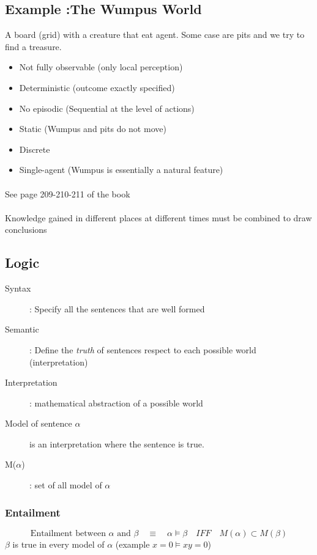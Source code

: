 \subsection{Example :The Wumpus World}
A board (grid) with a creature that eat agent. Some case are pits and we try to find a treasure. 
\begin{itemize}
    \item Not fully observable (only local perception)
    \item Deterministic (outcome exactly specified)
    \item No episodic  (Sequential at the level of actions)
    \item Static (Wumpus and pits do not move)
    \item Discrete
    \item Single-agent (Wumpus is essentially a natural feature)
\end{itemize}

\paragraph{ } See page 209-210-211 of the book

\paragraph{ } Knowledge gained in different places at different times must
be combined to draw conclusions


\subsection{Logic}
\begin{description}
    \item[Syntax] : Specify all the sentences that are well formed
    \item[Semantic] : Define the \textit{truth} of sentences respect to each
        possible world (interpretation)
    \item[Interpretation] : mathematical abstraction of a possible world
    \item[Model of sentence $\alpha$] is an interpretation where the sentence 
        is true. 
    \item[M($\alpha$)] : set of all model of $\alpha$
\end{description}

\subsubsection{Entailment} 
$$\textrm{Entailment between } \alpha \textrm{ and } \beta
\quad \equiv \quad \alpha \models \beta  \quad IFF \quad M(\alpha) \subset M(\beta)$$
$\beta$ is true in every model of $\alpha$ (example $x=0 \models xy=0$)

